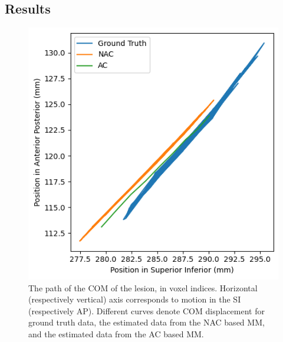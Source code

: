         \subsection{Results} \label{sec:pet_ct_respiratory_motion_correction_with_a_single_attenuation_map_using_nac_derived_deformation_fields_results}
            \begin{figure}
                \centering
                
                \includegraphics[width=1.0\linewidth]{figures/motion_correction_1_results_2_com.png}
                
                \captionsetup{singlelinecheck=false}
                \caption{
                    The path of the \gls{COM} of the lesion, in voxel indices. Horizontal (respectively vertical) axis corresponds to motion in the \gls{SI} (respectively \gls{AP}). Different curves denote \gls{COM} displacement for  ground truth data, the estimated data from the \gls{NAC} based \gls{MM}, and the estimated data from the \gls{AC} based \gls{MM}.
                }
                \label{fig:pet_ct_respiratory_motion_correction_with_a_single_attenuation_map_using_nac_derived_deformation_fields_results_com}
            \end{figure}
            
